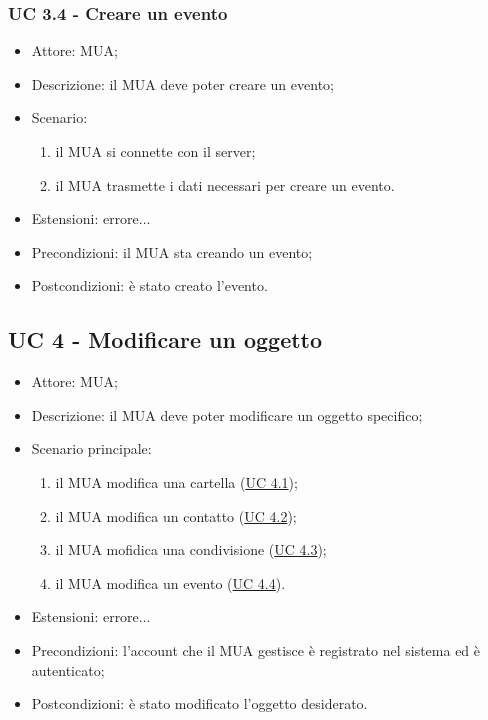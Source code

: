     \subsubsection{UC 3.4 - Creare un evento} \label{sec: UC 3.4}
    \begin{itemize}
        \item Attore: MUA;
        \item Descrizione: il MUA deve poter creare un evento;
        \item Scenario:
        \begin{enumerate}
        \item il MUA si connette con il server;
        \item il MUA trasmette i dati necessari per creare un evento.
        \end{enumerate}
        \item Estensioni: errore...
        \item Precondizioni: il MUA sta creando un evento;
        \item Postcondizioni: è stato creato l'evento.
    \end{itemize}

    \subsection{UC 4 - Modificare un oggetto} \label{sec: UC 4}
    \begin{itemize}
        \item Attore: MUA;
        \item Descrizione: il MUA deve poter modificare un oggetto specifico;
        \item Scenario principale:
            \begin{enumerate}
            \item il MUA modifica una cartella (\hyperref[sec: UC 4.1]{UC 4.1});
            \item il MUA modifica un contatto (\hyperref[sec: UC 4.2]{UC 4.2});
            \item il MUA mofidica una condivisione (\hyperref[sec: UC 4.3]{UC 4.3});
            \item il MUA modifica un evento (\hyperref[sec: UC 4.4]{UC 4.4}).
            \end{enumerate}
        \item Estensioni: errore...
        \item Precondizioni: l’account che il MUA gestisce è registrato nel sistema ed è autenticato;
        \item Postcondizioni: è stato modificato l’oggetto desiderato.
    \end{itemize}

